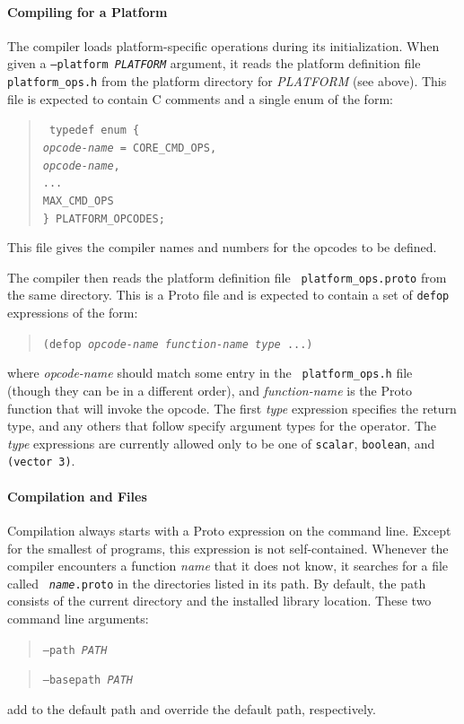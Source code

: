 \documentclass{article}
\newcommand\code[1]{\begin{quote}\var{#1}\end{quote}}
\newcommand\var[1]{{\tt #1}}
\begin{document}
\paragraph{Compiling for a Platform}
The compiler loads platform-specific operations during its
initialization.  When given a \var{--platform {\it PLATFORM}}
argument, it reads the platform definition file {\tt platform\_ops.h}
from the platform directory for {\it PLATFORM} (see above).
This file is expected to contain C comments and a single enum of
the form: 
\code{
typedef enum \{\\
  {\it opcode-name} = CORE\_CMD\_OPS,\\
  {\it opcode-name},\\
  ...\\
  MAX\_CMD\_OPS\\
\} PLATFORM\_OPCODES;}
This file gives the compiler names and numbers for the opcodes to be
defined.

The compiler then reads the platform definition file {\tt
  platform\_ops.proto} from the same directory.  This is a Proto file
and is expected to contain a set of \var{defop} expressions of the
form: \code{(defop {\it opcode-name} {\it function-name} {\it type}
  ...)}  where {\it opcode-name} should match some entry in the {\tt
  platform\_ops.h} file (though they can be in a different order), and
{\it function-name} is the Proto function that will invoke the opcode.
The first {\it type} expression specifies the return type, and any
others that follow specify argument types for the operator.  The {\it
  type} expressions are currently allowed only to be one of
\var{scalar}, \var{boolean}, and \var{(vector 3)}.

\paragraph{Compilation and Files}

Compilation always starts with a Proto expression on the command line.
Except for the smallest of programs, this expression is not
self-contained.  Whenever the compiler encounters a function {\it
  name} that it does not know, it searches for a file called \var{{\it
    name}.proto} in the directories listed in its path.  By default,
the path consists of the current directory and the installed library
location.  These two command line arguments: \code{--path {\it PATH}}
\code{--basepath {\it PATH}} add to the default path and override the
default path, respectively.
\end{document}
